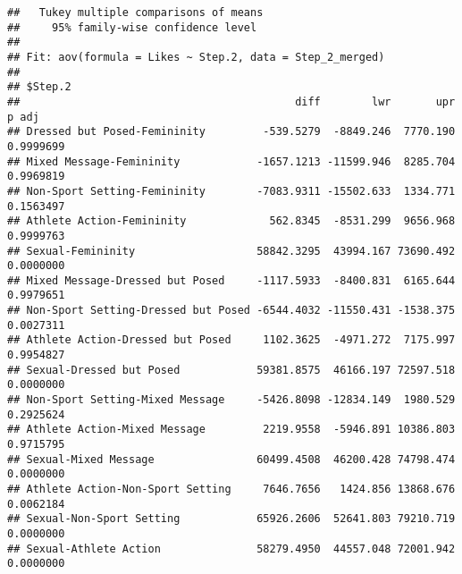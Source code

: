 \documentclass[
]{article}
\newenvironment{Shaded}{\begin{snugshade}}{\end{snugshade}}
\newcommand{\CommentTok}[1]{\textcolor[rgb]{0.56,0.35,0.01}{\textit{#1}}}
\newcommand{\FloatTok}[1]{\textcolor[rgb]{0.00,0.00,0.81}{#1}}
\newcommand{\FunctionTok}[1]{\textcolor[rgb]{0.00,0.00,0.00}{#1}}
\newcommand{\NormalTok}[1]{#1}
\newcommand{\OtherTok}[1]{\textcolor[rgb]{0.56,0.35,0.01}{#1}}
\newcommand{\SpecialCharTok}[1]{\textcolor[rgb]{0.00,0.00,0.00}{#1}}
\begin{document}
\begin{verbatim}
##   Tukey multiple comparisons of means
##     95% family-wise confidence level
## 
## Fit: aov(formula = Likes ~ Step.2, data = Step_2_merged)
## 
## $Step.2
##                                           diff        lwr       upr     p adj
## Dressed but Posed-Femininity         -539.5279  -8849.246  7770.190 0.9999699
## Mixed Message-Femininity            -1657.1213 -11599.946  8285.704 0.9969819
## Non-Sport Setting-Femininity        -7083.9311 -15502.633  1334.771 0.1563497
## Athlete Action-Femininity             562.8345  -8531.299  9656.968 0.9999763
## Sexual-Femininity                   58842.3295  43994.167 73690.492 0.0000000
## Mixed Message-Dressed but Posed     -1117.5933  -8400.831  6165.644 0.9979651
## Non-Sport Setting-Dressed but Posed -6544.4032 -11550.431 -1538.375 0.0027311
## Athlete Action-Dressed but Posed     1102.3625  -4971.272  7175.997 0.9954827
## Sexual-Dressed but Posed            59381.8575  46166.197 72597.518 0.0000000
## Non-Sport Setting-Mixed Message     -5426.8098 -12834.149  1980.529 0.2925624
## Athlete Action-Mixed Message         2219.9558  -5946.891 10386.803 0.9715795
## Sexual-Mixed Message                60499.4508  46200.428 74798.474 0.0000000
## Athlete Action-Non-Sport Setting     7646.7656   1424.856 13868.676 0.0062184
## Sexual-Non-Sport Setting            65926.2606  52641.803 79210.719 0.0000000
## Sexual-Athlete Action               58279.4950  44557.048 72001.942 0.0000000
\end{verbatim}

\begin{Shaded}
\end{Shaded}
\end{document}
